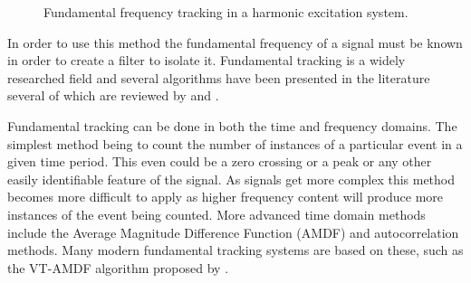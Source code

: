 		\begin{figure}[h!]
			\centering
			\caption{Fundamental frequency tracking in a harmonic excitation system.}
			\label{fig:F0Tracking}
		\end{figure}


		In order to use this method the fundamental frequency of a signal must be known in order to create a filter
		to isolate it. Fundamental tracking is a widely researched field and several algorithms have been presented
		in the literature several of which are reviewed by \citet{cuadra2001efficient} and
		\citet{gerhard2003pitch}.

		Fundamental tracking can be done in both the time and frequency domains. The simplest method being to count
		the number of instances of a particular event in a given time period. This even could be a zero crossing or
		a peak or any other easily identifiable feature of the signal. As signals get more complex this method
		becomes more difficult to apply as higher frequency content will produce more instances of the event being
		counted. More advanced time domain methods include the Average Magnitude Difference Function (AMDF) and
		autocorrelation methods. Many modern fundamental tracking systems are based on these, such as the VT-AMDF
		algorithm proposed by \citet{prukkanon2009vt-amdf}.

